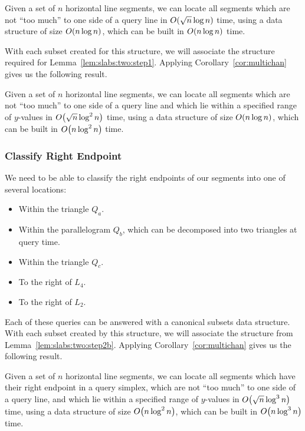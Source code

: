 \begin{lemma}
\label{lem:slabs:two:step2a}
Given a set of $n$ horizontal line segments, we can locate all segments which are not ``too much'' to one side of a query line in $O\!\left(\sqrt{n}\log{n}\right)$ time, using a data structure of size $O\!\left(n\log{n}\right)$, which can be built in $O\!\left(n\log{n}\right)$ time.
\end{lemma}

With each subset created for this structure, we will associate the structure required for Lemma~\ref{lem:slabs:two:step1}.
Applying Corollary~\ref{cor:multichan} gives us the following result.

\begin{lemma}
\label{lem:slabs:two:step2b}
Given a set of $n$ horizontal line segments, we can locate all segments which are not ``too much'' to one side of a query line and which lie within a specified range of $y$-values in $O\!\left(\sqrt{n}\log^2{n}\right)$ time, using a data structure of size $O\!\left(n\log{n}\right)$, which can be built in $O\!\left(n\log^2{n}\right)$ time.
\end{lemma}


\subsubsection{Classify Right Endpoint}

We need to be able to classify the right endpoints of our segments into one of several locations:
\begin{itemize}
 \item Within the triangle $Q_a$.
 \item Within the parallelogram $Q_b$, which can be decomposed into two triangles at query time.
 \item Within the triangle $Q_c$.
 \item To the right of $L_4$.
 \item To the right of $L_2$.
\end{itemize}

Each of these queries can be answered with a canonical subsets data structure. 
With each subset created by this structure, we will associate the structure from Lemma~\ref{lem:slabs:two:step2b}. 
Applying Corollary~\ref{cor:multichan} gives us the following result.

\begin{lemma}
\label{lem:slabs:two:step3}
Given a set of $n$ horizontal line segments, we can locate all segments which have their right endpoint in a query simplex, which are not ``too much'' to one side of a query line, and which lie within a specified range of $y$-values in $O\!\left(\sqrt{n}\log^3{n}\right)$ time, using a data structure of size $O\!\left(n\log^2{n}\right)$, which can be built in $O\!\left(n\log^3{n}\right)$ time.
\end{lemma}


